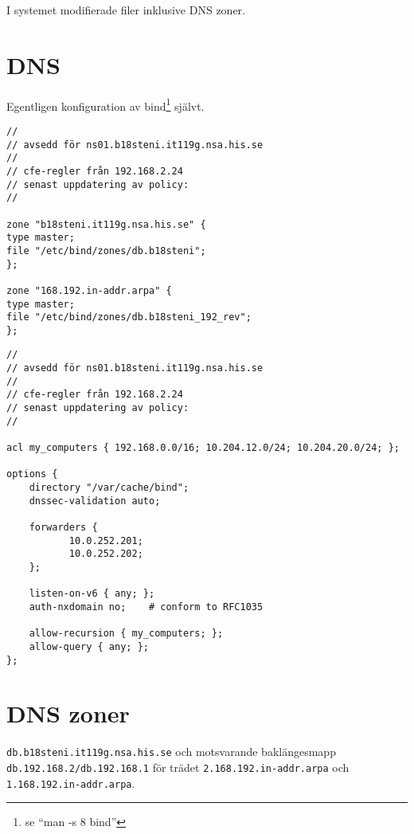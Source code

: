 \documentclass[11pt,a4paper]{article}
\begin{document}
\appendix

I systemet modifierade filer inklusive DNS zoner.

\section{DNS}\label{sec:appendix_bind_config}

Egentligen konfiguration av bind\footnote{se ``man -s 8 bind''} självt.

\begin{lstlisting}[caption={/etc/bind/named.conf.local}]
//
// avsedd för ns01.b18steni.it119g.nsa.his.se
//
// cfe-regler från 192.168.2.24
// senast uppdatering av policy:
//

zone "b18steni.it119g.nsa.his.se" {
type master;
file "/etc/bind/zones/db.b18steni";
};

zone "168.192.in-addr.arpa" {
type master;
file "/etc/bind/zones/db.b18steni_192_rev";
};
\end{lstlisting}

\begin{lstlisting}[caption={/etc/bind/named.conf.options}]
//
// avsedd för ns01.b18steni.it119g.nsa.his.se
//
// cfe-regler från 192.168.2.24
// senast uppdatering av policy:
//

acl my_computers { 192.168.0.0/16; 10.204.12.0/24; 10.204.20.0/24; };

options {
    directory "/var/cache/bind";
    dnssec-validation auto;

    forwarders {
           10.0.252.201;
           10.0.252.202;
    };

    listen-on-v6 { any; };
    auth-nxdomain no;    # conform to RFC1035

    allow-recursion { my_computers; };
    allow-query { any; };
};
\end{lstlisting}

\section{DNS zoner}\label{sec:appendix_dns_zones}

\texttt{db.b18steni.it119g.nsa.his.se} och motsvarande baklängesmapp\@
\texttt{ db.192.168.2/db.192.168.1} för trädet \texttt{2.168.192.in-addr.arpa}
och \texttt{1.168.192.in-addr.arpa}.
\printbibliography{}
\end{document}
